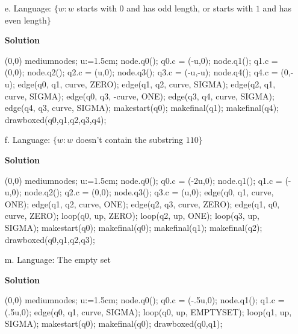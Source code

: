 \documentclass{article}
\begin{document}
\begin{empfile}
\begin{itemize}
\item[e.] Language: $\{w:w$ starts with $0$ and has odd length, or
starts with $1$ and has even length$\}$

\textbf{Solution}
	\begin{center}
	\begin{emp}(0,0)
	mediumnodes;
	u:=1.5cm;
	node.q0(); q0.c = (-u,0);
	node.q1(); q1.c = (0,0);
	node.q2(); q2.c = (u,0);
	node.q3(); q3.c = (-u,-u);
	node.q4(); q4.c = (0,-u);
	edge(q0, q1, curve, ZERO);
	edge(q1, q2, curve, SIGMA);
	edge(q2, q1, curve, SIGMA);
	edge(q0, q3, -curve, ONE);
	edge(q3, q4, curve, SIGMA);
	edge(q4, q3, curve, SIGMA);
	makestart(q0);
	makefinal(q1);
	makefinal(q4);
	drawboxed(q0,q1,q2,q3,q4);
	\end{emp}
	\end{center}

\item[f.] Language: $\{w:w$ doesn't contain the substring $110\}$

\textbf{Solution}
	\begin{center}
	\begin{emp}(0,0)
	mediumnodes;
	u:=1.5cm;
	node.q0(); q0.c = (-2u,0);
	node.q1(); q1.c = (-u,0);
	node.q2(); q2.c = (0,0);
	node.q3(); q3.c = (u,0);
	edge(q0, q1, curve, ONE);
	edge(q1, q2, curve, ONE);
	edge(q2, q3, curve, ZERO);
	edge(q1, q0, curve, ZERO);
	loop(q0, up, ZERO);
	loop(q2, up, ONE);
	loop(q3, up, SIGMA);
	makestart(q0);
	makefinal(q0);
	makefinal(q1);
	makefinal(q2);
	drawboxed(q0,q1,q2,q3);
	\end{emp}
	\end{center}

\item[m.] Language: The empty set

\textbf{Solution}
	\begin{center}
	\begin{emp}(0,0)
	mediumnodes;
	u:=1.5cm;
	node.q0(); q0.c = (-.5u,0);
	node.q1(); q1.c = (.5u,0);
	edge(q0, q1, curve, SIGMA);
	loop(q0, up, EMPTYSET);
	loop(q1, up, SIGMA);
	makestart(q0);
	makefinal(q0);
	drawboxed(q0,q1);
	\end{emp}
	\end{center}
\end{itemize}

\end{empfile}
\immediate{}
\end{document}
